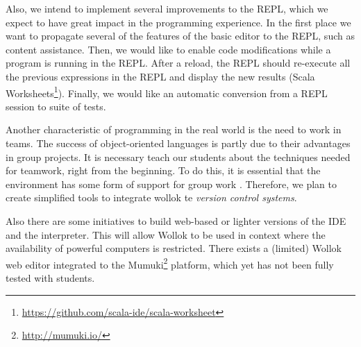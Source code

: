 Also, we intend to implement several improvements to the REPL, which we expect to have great impact in the programming experience.
In the first place we want to propagate several of the features of the basic editor to the REPL, such as content assistance.
Then, we would like to enable code modifications while a program is running in the REPL.
After a reload, the REPL should re-execute all the previous expressions in the REPL and display the new results (\cf Scala Worksheets\footnote{\url{https://github.com/scala-ide/scala-worksheet}}).
Finally, we would like an automatic conversion from a REPL session to suite of tests.

Another characteristic of programming in the real world is the need to work in teams. 
The success of object-oriented languages is partly due to their advantages in group projects. 
It is necessary teach our students about the techniques needed for teamwork, right from the beginning. 
To do this, it is essential that the environment has some form of support for group work \cite{kolling_problem_1999}.
Therefore, we plan to create simplified tools to integrate wollok te \emph{version control systems}.

Also there are some initiatives to build web-based or lighter versions of the IDE and the interpreter.
This will allow Wollok to be used in context where the availability of powerful computers is restricted.
There exists a (limited) Wollok web editor integrated to the Mumuki\footnote{\url{http://mumuki.io/}} platform, which yet has not been fully tested with students.
